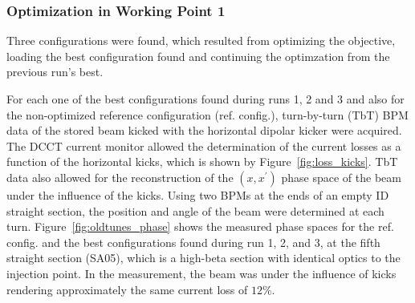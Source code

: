 \subsubsection{Optimization in Working Point 1}
Three configurations were found, which resulted from optimizing the objective, loading the best configuration found and continuing the optimzation from the previous run's best.

For each one of the best configurations found during runs 1, 2 and 3 and also for the non-optimized reference configuration (ref. config.), turn-by-turn (TbT) BPM data of the stored beam kicked with the horizontal dipolar kicker were acquired. The DCCT current monitor allowed the determination of the current losses as a function of the horizontal kicks, which is shown by Figure~\ref{fig:loss_kicks}.
TbT data also allowed for the reconstruction of the $(x,x^\prime)$ phase space of the beam under the influence of the kicks. Using two BPMs at the ends of an empty ID straight section, the position and angle of the beam were determined at each turn.
Figure~\ref{fig:oldtunes_phase} shows the measured phase spaces for the ref. config. and the best configurations found during run 1, 2, and 3, at the fifth straight section (SA05), which is a high-beta section with identical optics to the injection point. In the measurement, the beam was under the influence of kicks rendering approximately the same current loss of $12\%$.

